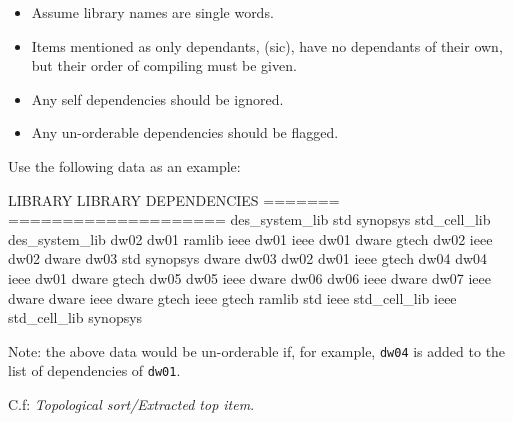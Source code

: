\begin{itemize}
\item
  Assume library names are single words.
\item
  Items mentioned as only dependants, (sic), have no dependants of their
  own, but their order of compiling must be given.
\item
  Any self dependencies should be ignored.
\item
  Any un-orderable dependencies should be flagged.
\end{itemize}

Use the following data as an example:

\begin{wideverbatim}
LIBRARY          LIBRARY DEPENDENCIES
=======          ====================
des_system_lib   std synopsys std_cell_lib des_system_lib dw02 dw01 ramlib ieee
dw01             ieee dw01 dware gtech
dw02             ieee dw02 dware
dw03             std synopsys dware dw03 dw02 dw01 ieee gtech
dw04             dw04 ieee dw01 dware gtech
dw05             dw05 ieee dware
dw06             dw06 ieee dware
dw07             ieee dware
dware            ieee dware
gtech            ieee gtech
ramlib           std ieee
std_cell_lib     ieee std_cell_lib
synopsys         
\end{wideverbatim}

Note: the above data would be un-orderable if, for example,
\texttt{dw04} is added to the list of dependencies of \texttt{dw01}.

C.f: \emph{Topological sort/Extracted top item}.




